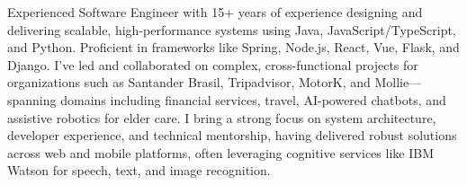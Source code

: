 

\begin{cvparagraph}

Experienced Software Engineer with 15+ years of experience designing and delivering scalable, high-performance systems using Java, JavaScript\allowbreak/\allowbreak TypeScript, and Python. Proficient in frameworks like Spring, Node.js, React, Vue, Flask, and Django. I’ve led and collaborated on complex, cross-functional projects for organizations such as Santander Brasil, Tripadvisor, MotorK, and Mollie—spanning domains including financial services, travel, AI-powered chatbots, and assistive robotics for elder care. I bring a strong focus on system architecture, developer experience, and technical mentorship, having delivered robust solutions across web and mobile platforms, often leveraging cognitive services like IBM Watson for speech, text, and image recognition.
\end{cvparagraph}
